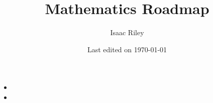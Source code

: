 \documentclass[a4, 12pt]{article}
\title{Mathematics Roadmap}
\author{Isaac Riley}
\date{Last edited on \today}
\begin{document}
\maketitle
\begin{itemize}
    \item 
    \item 
\end{itemize}
\end{document}
